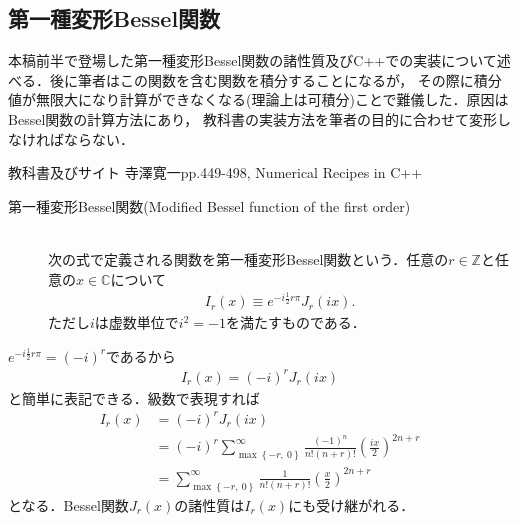 \documentclass[a4j,papersize,disablejfam,slide,14pt]{jsarticle}
\def\max#1#2{\operatorname{max} \left\{ #1,\ #2 \right\}} %
\def\exp#1{e^{#1}} %
\begin{document}
\subsection{第一種変形{\rm Bessel}関数}
\label{sec:appendix_bessel_property}
	本稿前半で登場した第一種変形{\rm Bessel}関数の諸性質及び{\rm C++}での実装について述べる．後に筆者はこの関数を含む関数を積分することになるが，
    その際に積分値が無限大になり計算ができなくなる(理論上は可積分)ことで難儀した．原因は{\rm Bessel}関数の計算方法にあり，
    教科書の実装方法を筆者の目的に合わせて変形しなければならない．
    \begin{itembox}[l]{教科書及びサイト}
    	{\rm 寺澤寛一\cite{terakan}pp.449-498, Numerical Recipes in C++\cite{numerical_cpp}}
    \end{itembox}
    \begin{screen}
    	\begin{description}
        	\item[第一種変形{\rm Bessel}関数({\rm Modified Bessel function of the first order})]\mbox{}\\
            次の式で定義される関数を第一種変形{\rm Bessel}関数という．任意の$r\in \mathbb{Z}$と任意の$x \in \mathbb{C}$について
            \begin{align}
            	I_r(x) \equiv \exp{-i\frac{1}{2}r \pi} J_r(ix).
            \end{align}
            ただし$i$は虚数単位で$i^2=-1$を満たすものである．
        \end{description}
    \end{screen}
    $\exp{-i\frac{1}{2}r \pi}=(-i)^r$であるから
    \begin{align}
    	I_r(x) = (-i)^r J_r(ix)
    \end{align}
    と簡単に表記できる．級数で表現すれば
    \begin{align}
    	I_r(x) &= (-i)^r J_r(ix) \\
        &= (-i)^r \sum_{\max{-r}{0}}^{\infty} \frac{(-1)^n}{n!(n+r)!} \left( \frac{ix}{2} \right)^{2n+r} \\
        &= \sum_{\max{-r}{0}}^{\infty} \frac{1}{n!(n+r)!} \left( \frac{x}{2} \right)^{2n+r}
    \end{align}
    となる．{\rm Bessel}関数$J_r(x)$の諸性質は$I_r(x)$にも受け継がれる．
\end{document}
